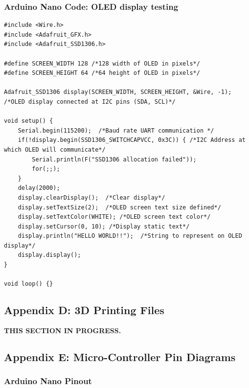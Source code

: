 \documentclass{article}
\begin{document}
	\subsubsection{Arduino Nano Code: OLED display testing}
\begin{lstlisting}[style=cppstyle]
#include <Wire.h>
#include <Adafruit_GFX.h>
#include <Adafruit_SSD1306.h>

#define SCREEN_WIDTH 128 /*128 width of OLED in pixels*/
#define SCREEN_HEIGHT 64 /*64 height of OLED in pixels*/

Adafruit_SSD1306 display(SCREEN_WIDTH, SCREEN_HEIGHT, &Wire, -1); /*OLED display connected at I2C pins (SDA, SCL)*/

void setup() {
	Serial.begin(115200);  /*Baud rate UART communication */
	if(!display.begin(SSD1306_SWITCHCAPVCC, 0x3C)) { /*I2C Address at which OLED will communicate*/
		Serial.println(F("SSD1306 allocation failed"));
		for(;;);
	}
	delay(2000);
	display.clearDisplay();  /*Clear display*/
	display.setTextSize(2);  /*OLED screen text size defined*/
	display.setTextColor(WHITE); /*OLED screen text color*/
	display.setCursor(0, 10); /*Display static text*/
	display.println("HELLO WORLD!!");  /*String to represent on OLED display*/
	display.display();
}

void loop() {}
\end{lstlisting}
	
	\subsection{Appendix D: 3D Printing Files}
	\textbf{THIS SECTION IN PROGRESS.}
	
	\subsection{Appendix E: Micro-Controller Pin Diagrams}
	
	\subsubsection{Arduino Nano Pinout}
	
\end{document}
